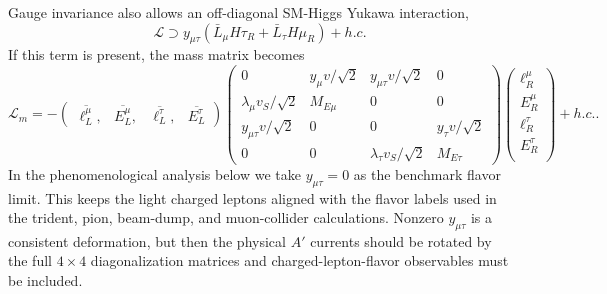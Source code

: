 \documentclass[onecolumn, aps, nofootinbib, prd, preprint, floats, floatfix, amsmath, amssymb, superscriptaddress, preprintnumbers]{revtex4-1}
\begin{document}
Gauge invariance also allows an off-diagonal SM-Higgs Yukawa interaction,
\begin{equation}
    \mathcal{L}\supset y_{\mu\tau} (\bar{L}_{\mu}H \tau_R + \bar{L}_{\tau}H \mu_R)+h.c.
\end{equation}
If this term is present, the mass matrix becomes
\begin{equation}
\mathcal{L}_m=-
\begin{pmatrix}
	\overline{\ell^{\mu}_L},  &
	\overline{E^\mu_L}, &
	\overline{\ell^\tau_L}, &
	\overline{E^\tau_L}
\end{pmatrix}
\begin{pmatrix}
	0 & y_{\mu}v/\sqrt2  & y_{\mu\tau}v/\sqrt2 & 0 \\
	\lambda_\mu v_S/\sqrt2 & M_{E\mu} & 0 & 0\\
	y_{\mu\tau}v/\sqrt2 & 0 & 0 & y_{\tau}v/\sqrt2\\
    0 & 0 &  \lambda_\tau v_S/\sqrt2 & M_{E\tau}
\end{pmatrix}
\begin{pmatrix}
	\ell^{\mu}_R \\
	E^\mu_R \\
	  \ell^\tau_R \\
	  E^\tau_R \\
\end{pmatrix}
+h.c. .
\label{eq:4by4-mass-mutau}
\end{equation}
In the phenomenological analysis below we take \(y_{\mu\tau}=0\) as the benchmark flavor limit. This keeps the light charged leptons aligned with the flavor labels used in the trident, pion, beam-dump, and muon-collider calculations. Nonzero \(y_{\mu\tau}\) is a consistent deformation, but then the physical \(A'\) currents should be rotated by the full \(4\times4\) diagonalization matrices and charged-lepton-flavor observables must be included.
\end{document}
